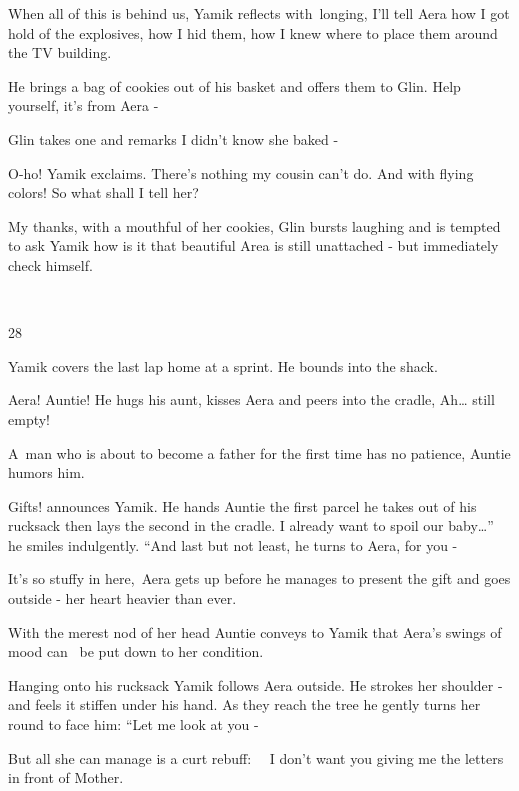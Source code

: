 \documentclass[letterpaper]{article}
\begin{document}
When all of this is behind us, Yamik reflects with~longing, I'll tell Aera how I got hold of the explosives, how I hid
them, how I knew where to place them around the TV building.

He brings a bag of cookies out of his basket and offers them to Glin. {\textquotedbl}Help yourself, it's from Aera
-{\textquotedbl} 

Glin takes one and remarks {\textquotedbl}I didn't know she baked -{\textquotedbl}

{\textquotedbl}O-ho!{\textquotedbl} Yamik exclaims. {\textquotedbl}There's nothing my cousin can't do. And with flying
colors! So what shall I tell her?{\textquotedbl} 

{\textquotedbl}My thanks, with a mouthful of her cookies,{\textquotedbl} Glin bursts laughing and is tempted to ask
Yamik how is it that beautiful Area is still unattached - but immediately check himself.

~

28~~~~~~~~~~~~~~ 

Yamik covers the last lap home at a sprint. He bounds into the shack. 

{\textquotedbl}Aera! Auntie!{\textquotedbl} He hugs his aunt, kisses Aera and peers into the cradle,
{\textquotedbl}Ah{\dots} still empty!{\textquotedbl} 

{\textquotedbl}A~man who is about to become a father for the first time has no patience,{\textquotedbl} Auntie humors
him. 

{\textquotedbl}Gifts!{\textquotedbl} announces Yamik. He hands Auntie the first parcel he takes out of his rucksack then
lays the second in the cradle. {\textquotedbl}I already want to spoil our baby{\dots}'' he smiles indulgently. ``And
last but not least,{\textquotedbl} he turns to Aera, {\textquotedbl}for you -{\textquotedbl}

{\textquotedbl}It's so stuffy in here,{\textquotedbl}~Aera gets up before he manages to present the gift and goes
outside - her heart heavier than ever.

With the merest nod of her head Auntie conveys to Yamik that Aera's swings of mood can \ be put down to her condition. 

Hanging onto his rucksack Yamik follows Aera outside. He strokes her shoulder - and feels it stiffen under his hand. As
they reach the tree he gently turns her round to face him: ``Let me look at you -{\textquotedbl}

But all she can manage is a curt rebuff: \ \ {\textquotedbl}I don't want you giving me the letters in front of
Mother.{\textquotedbl} 
\end{document}
